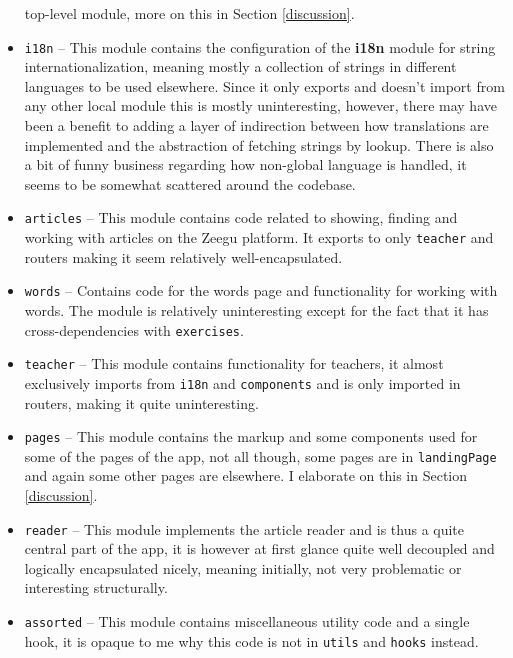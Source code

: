 \documentclass{article}
\begin{document}
\begin{itemize}
                                                                                     top-level module, more on this in Section \ref{discussion}.
  \item \verb|i18n| -- This module contains the configuration of the \textbf{i18n} module for string internationalization,
                       meaning mostly a collection of strings in different languages to be used elsewhere.
                       Since it only exports and doesn't import from any other local module this is mostly uninteresting,
                       however, there may have been a benefit to adding a layer of indirection between how translations are implemented
                       and the abstraction of fetching strings by lookup. There is also a bit of funny business regarding how non-global
                       language is handled, it seems to be somewhat scattered around the codebase.
  \item \verb|articles| -- This module contains code related to showing, finding and working with articles on the Zeegu platform.
                           It exports to only \verb|teacher| and routers making it seem relatively well-encapsulated.
  \item \verb|words| -- Contains code for the words page and functionality for working with words.
                        The module is relatively uninteresting except for the fact that it has cross-dependencies with \verb|exercises|.
  \item \verb|teacher| -- This module contains functionality for teachers, 
                          it almost exclusively imports from \verb|i18n| and \verb|components|
                          and is only imported in routers, making it quite uninteresting.
  \item \verb|pages| -- This module contains the markup and some components used for some of the pages of the app,
                        not all though, some pages are in \verb|landingPage| and again some other pages are elsewhere.
                        I elaborate on this in Section \ref{discussion}.
  \item \verb|reader| -- This module implements the article reader and is thus a quite central part of the app,
                         it is however at first glance quite well decoupled and logically encapsulated nicely,
                         meaning initially, not very problematic or interesting structurally.
  \item \verb|assorted| -- This module contains miscellaneous utility code and a single hook,
                           it is opaque to me why this code is not in \verb|utils| and \verb|hooks| instead.
\end{itemize}
\end{document}
